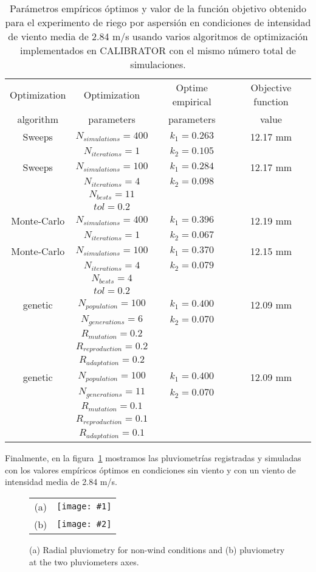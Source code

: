\documentclass[review,authoryear]{elsarticle}
\newcommand{\TABLE}[5]
{
	\begin{table}[ht!]
		\centering
		\caption{#4.\label{#5}}
		#1
		\begin{tabular}{#2}
			#3
		\end{tabular}
	\end{table}
}
\newcommand{\FIGii}[4]
{
	\begin{figure}[ht!]
		\centering
		\begin{tabular}{cc}
			(a) & \texttt{[image: \#1]} \\
			(b) & \texttt{[image: \#2]}
		\end{tabular}
		\caption{#3.\label{#4}}
	\end{figure}
}
\begin{document}
\TABLE{\scriptsize}{cccc}
{
	Optimization & Optimization & Optime empirical & Objective function
	\\ algorithm & parameters & parameters & value
	\\ \hline
	Sweeps & $N_{simulations}=400$ & $k_1=0.263$ & 12.17 mm
	\\ & $N_{iterations}=1$ & $k_2=0.105$
	\\ \hline
	Sweeps & $N_{simulations}=100$ & $k_1=0.284$ & 12.17 mm
	\\ & $N_{iterations}=4$ & $k_2=0.098$
	\\ & $N_{bests}=11$
	\\ & $tol=0.2$
	\\ \hline
	Monte-Carlo & $N_{simulations}=400$ & $k_1=0.396$ & 12.19 mm
	\\ & $N_{iterations}=1$ & $k_2=0.067$
	\\ \hline
	Monte-Carlo & $N_{simulations}=100$ & $k_1=0.370$ & 12.15 mm
	\\ & $N_{iterations}=4$ & $k_2=0.079$
	\\ & $N_{bests}=4$
	\\ & $tol=0.2$
	\\ \hline
	genetic & $N_{population}=100$ & $k_1=0.400$ & 12.09 mm
	\\ & $N_{generations}=6$ & $k_2=0.070$
	\\ & $R_{mutation}=0.2$
	\\ & $R_{reproduction}=0.2$
	\\ & $R_{adaptation}=0.2$
	\\ \hline
	genetic & $N_{population}=100$ & $k_1=0.400$ & 12.09 mm
	\\ & $N_{generations}=11$ & $k_2=0.070$
	\\ & $R_{mutation}=0.1$
	\\ & $R_{reproduction}=0.1$
	\\ & $R_{adaptation}=0.1$
	\\ \hline
}{Parámetros empíricos óptimos y valor de la función objetivo obtenido para el
experimento de riego por aspersión en condiciones de intensidad de viento media
de 2.84 m/s usando varios algoritmos de optimización implementados en CALIBRATOR
con el mismo número total de simulaciones}{TabSprinklerII}

Finalmente, en la figura~\ref{FigSprinkler} mostramos las pluviometrías
registradas y simuladas con los valores empíricos óptimos en condiciones sin
viento y con un viento de intensidad media de 2.84 m/s.

\FIGii{sprinkler-0.eps}{sprinkler-2,84.eps}
{(a) Radial pluviometry for non-wind conditions and (b) pluviometry at the two
pluviometers axes}{FigSprinkler}
\end{document}
